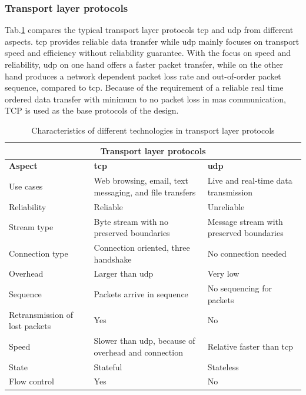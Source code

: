 \subsubsection{Transport layer protocols}
Tab.\ref{tab: transportlayer} compares the typical transport layer protocols \gls{tcp} and \gls{udp} from different aspects.  
\gls{tcp} provides reliable data transfer while \gls{udp} mainly focuses on transport speed and efficiency without reliability guarantee. 
With the focus on speed and reliability, \gls{udp} on one hand offers a faster packet transfer, while on the other hand produces a network dependent packet loss rate and out-of-order packet sequence, compared to \gls{tcp}. 
Because of the requirement of a reliable real time ordered data transfer with minimum to no packet loss in \gls{mas} communication, TCP is used as the base protocols of the design. 


\begin{table}[htbp]
    \small
    \centering
    \caption{Characteristics of different technologies in transport layer protocols}
    \label{tab: transportlayer}
    \begin{tabular}{|m{}|m{}|m{}|}
    \hline
    \multicolumn{3}{|c|}{\textbf{Transport layer protocols}}                                                            \\ \hline
    \textbf{Aspect}                         & \textbf{\gls{tcp}}             & \textbf{\gls{udp}}        \\ \hline
    Use cases                      & Web browsing, email, text messaging, and file transfers & Live and real-time data transmission \\ \hline
    Reliability                    & Reliable        & Unreliable \\ \hline
    Stream type                    & Byte stream with no preserved boundaries & Message stream with preserved boundaries \\ \hline
    Connection type                & Connection oriented, three handshake & No connection needed \\ \hline
    Overhead                       & Larger than \gls{udp} & Very low   \\ \hline
    Sequence                       & Packets arrive in sequence & No sequencing for packets \\ \hline
    Retransmission of lost packets & Yes             & No         \\ \hline
    Speed                          & Slower than \gls{udp}, because of overhead and connection & Relative faster than \gls{tcp} \\ \hline
    State                          & Stateful        & Stateless  \\ \hline
    Flow control                   & Yes             & No         \\ \hline
    \end{tabular}
    \end{table}




